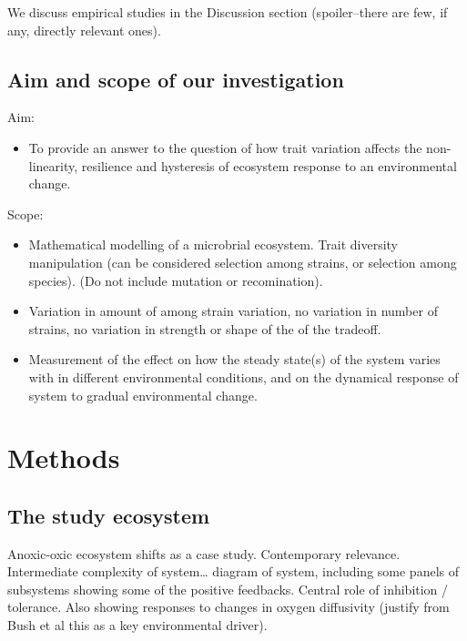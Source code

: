 \documentclass{article}
\begin{document}
We discuss empirical studies in the Discussion section (spoiler--there
are few, if any, directly relevant ones).

\hypertarget{aim-and-scope-of-our-investigation}{%
\subsection{Aim and scope of our
investigation}\label{aim-and-scope-of-our-investigation}}

Aim:

\begin{itemize}
\tightlist
\item
  To provide an answer to the question of how trait variation affects
  the non-linearity, resilience and hysteresis of ecosystem response to
  an environmental change.
\end{itemize}

Scope:

\begin{itemize}
\item
  Mathematical modelling of a microbrial ecosystem. Trait diversity
  manipulation (can be considered selection among strains, or selection
  among species). (Do not include mutation or recomination).
\item
  Variation in amount of among strain variation, no variation in number
  of strains, no variation in strength or shape of the of the tradeoff.
\item
  Measurement of the effect on how the steady state(s) of the system
  varies with in different environmental conditions, and on the
  dynamical response of system to gradual environmental change.
\end{itemize}

\hypertarget{methods}{%
\section{Methods}\label{methods}}

\hypertarget{the-study-ecosystem}{%
\subsection{The study ecosystem}\label{the-study-ecosystem}}

Anoxic-oxic ecosystem shifts as a case study. Contemporary relevance.
Intermediate complexity of system\ldots{} diagram of system, including
some panels of subsystems showing some of the positive feedbacks.
Central role of inhibition / tolerance. Also showing responses to
changes in oxygen diffusivity (justify from Bush et al this as a key
environmental driver).
\end{document}
